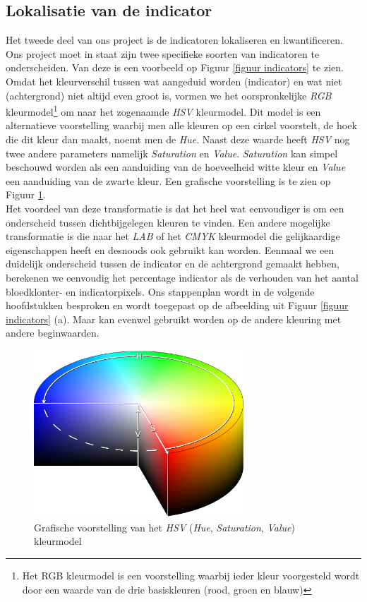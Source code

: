 \documentclass[a4paper,kulak]{kulakarticle}
\begin{document}
\subsection{Lokalisatie van de indicator} \label{lokalisatie_indicator}
Het tweede deel van ons project is de indicatoren lokaliseren en kwantificeren. Ons project moet in staat zijn twee specifieke soorten van indicatoren te onderscheiden. Van deze is een voorbeeld op Figuur \ref{figuur indicators} te zien. Omdat het kleurverschil tussen wat aangeduid worden (indicator) en wat niet (achtergrond) niet altijd even groot is, vormen we het oorspronkelijke \textit{RGB} kleurmodel\footnote{Het RGB kleurmodel is een voorstelling waarbij ieder kleur voorgesteld wordt door een waarde van de drie basiskleuren (rood, groen en blauw)} om naar het zogenaamde \textit{HSV} kleurmodel. Dit model is een alternatieve voorstelling waarbij men alle kleuren op een cirkel voorstelt, de hoek die dit kleur dan maakt, noemt men de \textit{Hue}. Naast deze waarde heeft \textit{HSV} nog twee andere parameters namelijk \textit{Saturation} en \textit{Value}. \textit{Saturation} kan simpel beschouwd worden als een aanduiding van de hoeveelheid witte kleur en \textit{Value} een aanduiding van de zwarte kleur. Een grafische voorstelling is te zien op Figuur \ref{figuur hsv_schema}.\\
Het voordeel van deze transformatie is dat het heel wat eenvoudiger is om een onderscheid tussen dichtbijgelegen kleuren te vinden. Een andere mogelijke transformatie is die naar het \textit{LAB} of het \textit{CMYK} kleurmodel die gelijkaardige eigenschappen heeft en desnoods ook gebruikt kan worden. Eenmaal we een duidelijk onderscheid tussen de indicator en de achtergrond gemaakt hebben, berekenen we eenvoudig het percentage indicator als de verhouden van het aantal bloedklonter- en indicatorpixels. Ons stappenplan wordt in de volgende hoofdstukken besproken en wordt toegepast op de afbeelding uit Figuur \ref{figuur indicators} (a). Maar kan evenwel gebruikt worden op de andere kleuring met andere beginwaarden.

\begin{figure}[H]
	\centering
	\includegraphics[width=0.7\textwidth]{HSV_vb.png}
	
	\caption{Grafische voorstelling van het \textit{HSV} (\textit{Hue}, \textit{Saturation}, \textit{Value}) kleurmodel}
	\label{figuur hsv_schema}
\end{figure}
\end{document}
